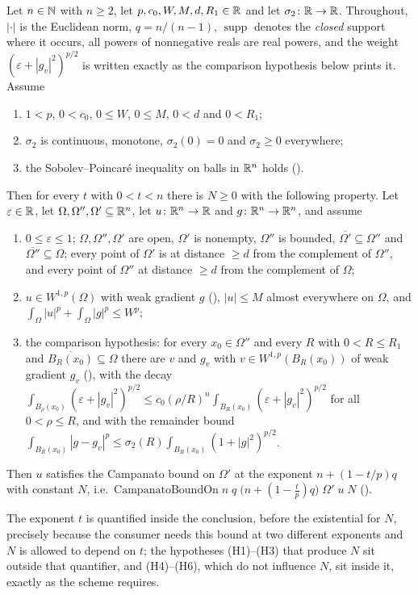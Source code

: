 \begin{helper}
Let $n\in\mathbb{N}$ with $n\ge2$, let $p,c_0,W,M,d,R_1\in\mathbb{R}$ and let
$\sigma_2\colon\mathbb{R}\to\mathbb{R}$.  Throughout, $|\cdot|$ is the Euclidean norm, $q=n/(n-1)$,
$\operatorname{supp}$ denotes the \emph{closed} support where it occurs, all
powers of nonnegative reals are real powers, and the weight
$(\varepsilon+|g_v|^2)^{p/2}$ is written exactly as the comparison hypothesis
below prints it.  Assume
\begin{enumerate}
\item[(H1)] $1<p$, $0<c_0$, $0\le W$, $0\le M$, $0<d$ and $0<R_1$;
\item[(H2)] $\sigma_2$ is continuous, monotone, $\sigma_2(0)=0$ and
  $\sigma_2\ge0$ everywhere;
\item[(H3)] the Sobolev--Poincaré inequality on balls in $\mathbb{R}^n$ holds
  ().
\end{enumerate}
Then for every $t$ with $0<t<n$ there is $N\ge0$ with the following property.
Let $\varepsilon\in\mathbb{R}$, let $\Omega,\Omega'',\Omega'\subseteq\mathbb{R}^n$, let
$u\colon\mathbb{R}^n\to\mathbb{R}$ and $g\colon\mathbb{R}^n\to\mathbb{R}^n$, and assume
\begin{enumerate}
\item[(H4)] $0\le\varepsilon\le1$; $\Omega,\Omega'',\Omega'$ are open, $\Omega'$
  is nonempty, $\Omega''$ is bounded,
  $\overline{\Omega'}\subseteq\Omega''$ and $\overline{\Omega''}\subseteq\Omega$;
  every point of $\Omega'$ is at distance $\ge d$ from the complement of
  $\Omega''$, and every point of $\Omega''$ at distance $\ge d$ from the
  complement of $\Omega$;
\item[(H5)] $u\in W^{1,p}(\Omega)$ with weak gradient $g$ (),
  $|u|\le M$ almost everywhere on $\Omega$, and
  $\int_\Omega|u|^p+\int_\Omega|g|^p\le W^p$;
\item[(H6)] the comparison hypothesis: for every $x_0\in\Omega''$ and every
  $R$ with $0<R\le R_1$ and $\overline{B_R(x_0)}\subseteq\Omega$ there are
  $v$ and $g_v$ with $v\in W^{1,p}(B_R(x_0))$ of weak gradient $g_v$
  (), with the decay
  $\int_{B_\rho(x_0)}(\varepsilon+|g_v|^2)^{p/2}
    \le c_0(\rho/R)^{n}\int_{B_R(x_0)}(\varepsilon+|g_v|^2)^{p/2}$
  for all $0<\rho\le R$, and with the remainder bound
  $\int_{B_R(x_0)}|g-g_v|^p\le\sigma_2(R)\int_{B_R(x_0)}(1+|g|^2)^{p/2}$.
\end{enumerate}
Then $u$ satisfies the Campanato bound on $\Omega'$ at the exponent
$n+(1-t/p)q$ with constant $N$, i.e.\
$\mathrm{CampanatoBoundOn}\;n\;q\;\bigl(n+(1-\tfrac tp)q\bigr)\;\Omega'\;u\;N$
(\noderef{CampanatoBoundOn}).

The exponent $t$ is quantified inside the conclusion, before the existential
for $N$, precisely because the consumer needs this bound at two different
exponents and $N$ is allowed to depend on $t$; the hypotheses (H1)--(H3) that
produce $N$ sit outside that quantifier, and (H4)--(H6), which do not influence
$N$, sit inside it, exactly as the scheme requires.
\end{helper}
